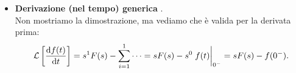 \begin{itemize}
\begin{proof}
\begin{align*}
	\end{align*}
	\end{proof}
	\item \textbf{Derivazione (nel tempo) generica} \rarr {} . \\
	Non mostriamo la dimostrazione, ma vediamo che è valida per la derivata prima:
	\begin{equation*}
		\lt{\dv{f(t)}{t}} = s^1 F(s) - \sum_{i=1}^1 \cdots = s F(s) - s^{0} \eval{f(t)}_{0^-} = sF(s)-f(0^-).
	\end{equation*}
\end{itemize}



















